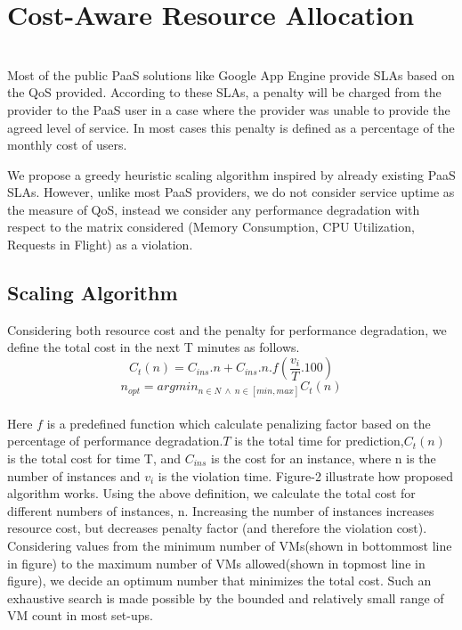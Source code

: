 \section{Cost-Aware Resource Allocation}\\
Most of the public PaaS solutions like Google App Engine provide SLAs based on the QoS provided. According to these SLAs, a penalty will be charged from the provider to the PaaS user in a case where the provider was unable to provide the agreed level of service. In most cases this penalty is defined as a percentage of the monthly cost of users.

We propose a greedy heuristic scaling algorithm inspired by already existing PaaS SLAs. However, unlike most PaaS providers, we do not consider service uptime as the measure of QoS, instead we consider any performance degradation with respect to the matrix considered (Memory Consumption, CPU Utilization, Requests in Flight) as a violation.

\subsection{Scaling Algorithm}
Considering both resource cost and the penalty for performance degradation, we define the total cost in the next T minutes as follows.\\

\textbf{$$ C_t(n) = C_{ins}.n  + C_{ins} . n . f(\frac{v_i}{T}.100) $$}
\textbf{$$n_{opt} = argmin_{n \in N \ \land \ n \in [min, max]}C_t(n)$$} \\


Here $f$ is a predefined function which calculate penalizing factor based on the percentage of performance degradation.$T$ is the total time for prediction,$C_t(n)$ is the total cost for time T, and $C_{ins}$ is the cost for an instance, where n is the number of instances and $v_i$ is the violation time. Figure-2 illustrate how proposed algorithm works. Using the above definition, we calculate the total cost for different numbers of instances, n. Increasing the number of instances increases resource cost, but decreases penalty factor (and therefore the violation cost). Considering values from the minimum number of VMs(shown in bottommost line in figure) to the maximum number of VMs allowed(shown in topmost line in figure), we decide an optimum number that minimizes the total cost. Such an exhaustive search is made possible by the bounded and relatively small range of VM count in most set-ups.